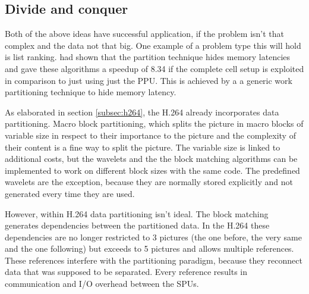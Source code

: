 \subsection{Divide and conquer}
\label{subsec:divide}
Both of the above ideas have successful application, if the problem isn't that complex and the data not that big. One example of a problem type this will hold is list ranking. \cite{listranking} had shown that the partition technique hides memory latencies and gave these algorithms a speedup of 8.34 if the complete cell setup is exploited in comparison to just using just the PPU. This is achieved by a a generic work partitioning technique to hide memory latency.

As elaborated in section \ref{subsec:h264}, the H.264 already incorporates data partitioning. Macro block partitioning, which splits the picture in macro blocks of variable size in respect to their importance to the picture and the complexity of their content is a fine way to split the picture. The variable size is linked to additional costs, but the wavelets and the the block matching algorithms can be implemented to work on different block sizes with the same code. The predefined wavelets are the exception, because they are normally stored explicitly and not generated every time they are used.

However, within H.264 data partitioning isn't ideal. The block matching generates dependencies between the partitioned data. In the H.264 these dependencies are no longer restricted to 3 pictures (the one before, the very same and the one following) but exceeds to 5 pictures and allows multiple references. These references interfere with the partitioning paradigm, because they reconnect data that was supposed to be separated. Every reference results in communication and I/O overhead between the SPUs.

